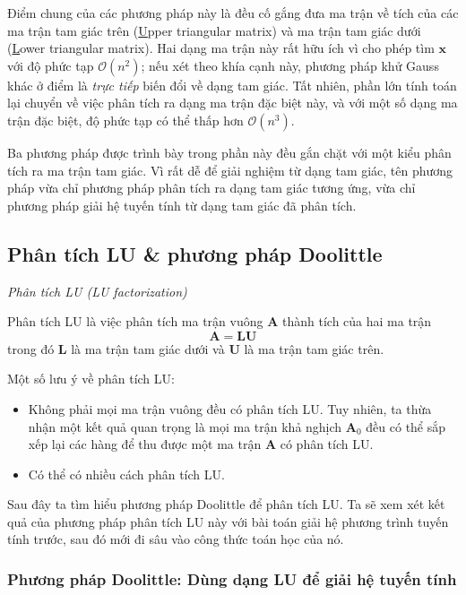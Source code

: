 \documentclass[../../Lectures]{subfiles}
\begin{document}
Điểm chung của các phương pháp này là đều cố gắng đưa ma trận về tích của các ma
trận tam giác trên (\underline{U}pper triangular matrix) và ma trận tam giác
dưới (\underline{L}ower triangular matrix). Hai dạng ma trận này rất hữu ích vì
cho phép tìm \(\bm{x}\) với độ phức tạp \(\mathcal{O} (n^2)\); nếu xét theo khía
cạnh này, phương pháp khử Gauss khác ở điểm là \emph{trực tiếp} biến đổi về dạng
tam giác. Tất nhiên, phần lớn tính toán lại chuyển về việc phân tích ra dạng ma
trận đặc biệt này, và với một số dạng ma trận đặc biệt, độ phức tạp có thể thấp
hơn \(\mathcal{O} (n^3)\).

Ba phương pháp được trình bày trong phần này đều gắn chặt với một kiểu phân tích
ra ma trận tam giác. Vì rất dễ để giải nghiệm từ dạng tam giác, tên phương pháp
vừa chỉ phương pháp phân tích ra dạng tam giác tương ứng, vừa chỉ phương pháp
giải hệ tuyến tính từ dạng tam giác đã phân tích.

\subsection{Phân tích LU \& phương pháp Doolittle}

\begin{definition}
    \emph{Phân tích LU (LU factorization)}

    Phân tích LU là việc phân tích ma trận vuông \(\bm{A}\) thành tích của hai
    ma trận
    \[\bm{A} = \bm{LU}\] trong đó \(\bm{L}\) là ma trận tam giác dưới và
    \(\bm{U}\) là ma trận tam giác trên.
\end{definition}

Một số lưu ý về phân tích LU:
\begin{itemize}
    \item Không phải mọi ma trận vuông đều có phân tích LU. Tuy nhiên, ta thừa
        nhận một kết quả quan trọng là mọi ma trận khả nghịch \(\bm{A}_0\) đều
        có thể sắp xếp lại các hàng để thu được một ma trận \(\bm{A}\) có phân
        tích LU.

    \item Có thể có nhiều cách phân tích LU.
\end{itemize}

Sau đây ta tìm hiểu phương pháp Doolittle để phân tích LU. Ta sẽ xem xét kết quả
của phương pháp phân tích LU này với bài toán giải hệ phương trình tuyến tính
trước, sau đó mới đi sâu vào công thức toán học của nó.

\subsubsection{Phương pháp Doolittle: Dùng dạng LU để giải hệ tuyến tính}
\end{document}
